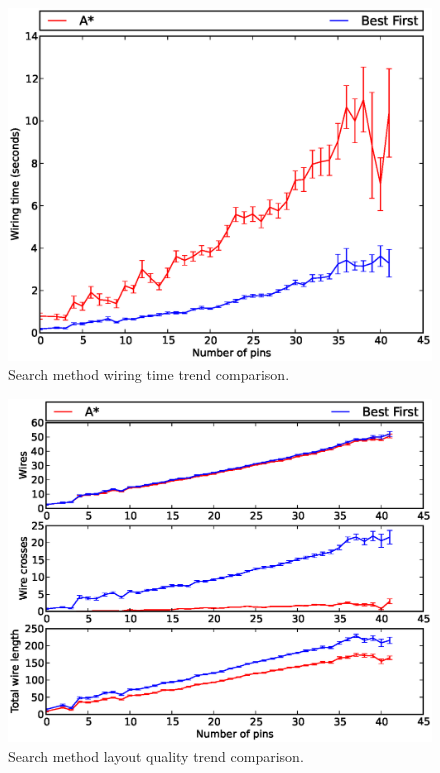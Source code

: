 \begin{figure}[H]
\begin{center}
\includegraphics[width=\textwidth]{Images/search_time_trend_comparison.eps}
\caption[Search method wiring time trend comparison]{Search method wiring time
trend comparison.}
\label{fig:search_time_trend}
\end{center}
\end{figure}

\begin{figure}[H]
\begin{center}
\includegraphics[width=\textwidth]{Images/search_quality_trend_comparison.eps}
\caption[Search method layout quality trend comparison]{Search method layout
quality trend comparison.}
\label{fig:search_quality_trend}
\end{center}
\end{figure}

